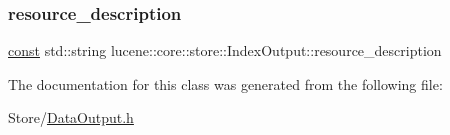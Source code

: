 \subsubsection{\texorpdfstring{resource\+\_\+description}{resource\_description}}
{\footnotesize\ttfamily \mbox{\hyperlink{ZlibCrc32_8h_a2c212835823e3c54a8ab6d95c652660e}{const}} std\+::string lucene\+::core\+::store\+::\+Index\+Output\+::resource\+\_\+description\hspace{0.3cm}{\ttfamily [private]}}



The documentation for this class was generated from the following file\+:\begin{DoxyCompactItemize}
\item 
Store/\mbox{\hyperlink{DataOutput_8h}{Data\+Output.\+h}}\end{DoxyCompactItemize}
